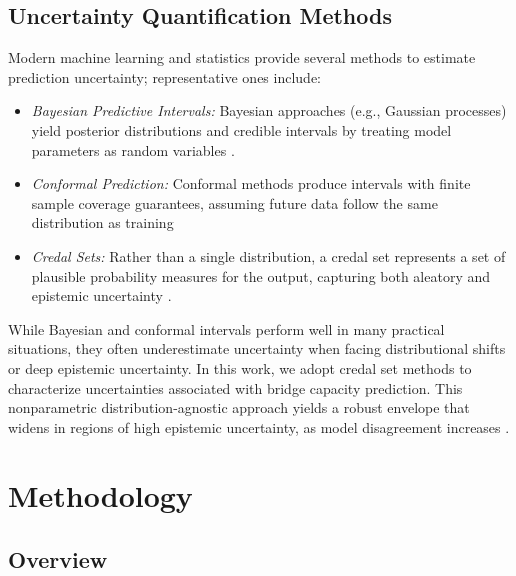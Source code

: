 \documentclass[authoryear,preprint,review,12pt]{elsarticle}
\begin{document}
\subsection{Uncertainty Quantification Methods}
Modern machine learning and statistics provide several methods to estimate prediction uncertainty; representative ones include:
\begin{itemize}
    \item \textit{Bayesian Predictive Intervals:} Bayesian approaches (e.g., Gaussian processes) yield posterior distributions and credible intervals by treating model parameters as random variables \citep{Rasmussen2006}.
    
    \item \textit{Conformal Prediction:} Conformal methods produce intervals with finite sample coverage guarantees, assuming future data follow the same distribution as training \citet{Angelopoulos2021}
    
    \item \textit{Credal Sets:} Rather than a single distribution, a credal set represents a set of plausible probability measures for the output, capturing both aleatory and epistemic uncertainty \citep{Walley1991,Hofman2022}.
\end{itemize}

While Bayesian and conformal intervals perform well in many practical situations, they often underestimate uncertainty when facing distributional shifts or deep epistemic uncertainty. In this work, we adopt credal set methods to characterize uncertainties associated with bridge capacity prediction. This nonparametric distribution-agnostic approach yields a robust envelope that widens in regions of high epistemic uncertainty, as model disagreement increases \citep{Breiman1996}. %

\section{Methodology}
\subsection{Overview}
\end{document}

